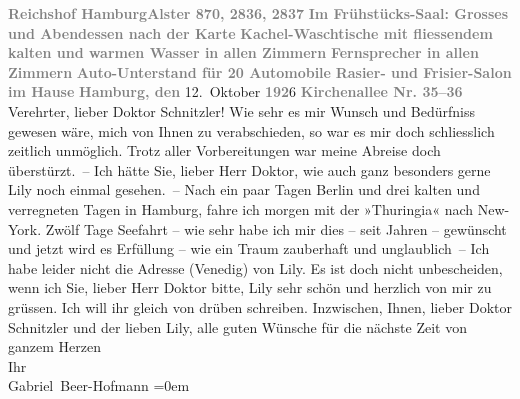 {\begin{ledgroupsized}[t]{13cm}
           \pstart
           \textcolor{gray}{\textbf{Reichshof Hamburg}}\hfill \textcolor{gray}{\textbf{Alster 870, 2836, 2837}}\pend
           \pstart
           \centering{}\textcolor{gray}{\textbf{Im Frühstücks-Saal: Grosses und Abendessen nach der
                            Karte}}\pend
           \pstart
           \noindent{}\centering{}\textcolor{gray}{\textbf{Kachel-Waschtische mit fliessendem kalten und warmen
                            Wasser in allen Zimmern}}\pend
           \pstart
           \noindent{}\textcolor{gray}{\textbf{Fernsprecher in allen Zimmern}}\pend
           \pstart
           \textcolor{gray}{\textbf{Auto-Unterstand für 20 Automobile}}\pend
           \pstart
           \textcolor{gray}{\textbf{Rasier- und Frisier-Salon im Hause}}\pend
           \pstart
           \raggedleft{}\textcolor{gray}{\textbf{Hamburg, den}}{ }12. Oktober \textcolor{gray}{\textbf{192}}6\pend
           \pstart
           \raggedleft{}\textcolor{gray}{\textbf{Kirchenallee Nr. 35–36}}\pend
           \pstart{}Verehrter, lieber Doktor Schnitzler!\pend\pstart
           Wie sehr es mir Wunsch und Bedürfniss gewesen wäre, mich von Ihnen zu
                    verabschieden, so war es mir doch schliesslich zeitlich unmöglich. Trotz aller
                    Vorbereitungen war meine Abreise doch überstürzt. –\pend
           \pstart
           Ich hätte Sie, lieber Herr Doktor, wie auch ganz besonders gerne Lily noch einmal gesehen. –\pend
           \pstart
           Nach ein paar Tagen Berlin und drei kalten und
                    verregneten Tagen in Hamburg, fahre ich morgen
                    mit der »Thuringia« nach New-York.\pend
           \pstart
           Zwölf Tage Seefahrt – wie sehr habe ich mir dies – seit Jahren – gewünscht und
                    jetzt wird es Erfüllung – wie ein Traum zauberhaft und unglaublich –\pend
           \pstart
           Ich habe leider nicht die Adresse (Venedig) von
                        Lily.\pend
           \pstart
           Es ist doch nicht unbescheiden, wenn ich Sie, lieber Herr Doktor {\pb}bitte, Lily sehr schön und herzlich von mir zu grüssen. Ich will
                    ihr gleich von drüben schreiben.\pend
           \pstart
           Inzwischen, Ihnen, lieber Doktor Schnitzler und der lieben Lily, alle guten Wünsche für die nächste Zeit\pend
           \pstart
           von ganzem Herzen{\\[\baselineskip]}Ihr{\\[\baselineskip]}\spacefill\mbox{Gabriel Beer-Hofmann}\pend
           \leftskip=0em{}
         

\end{ledgroupsized}}
